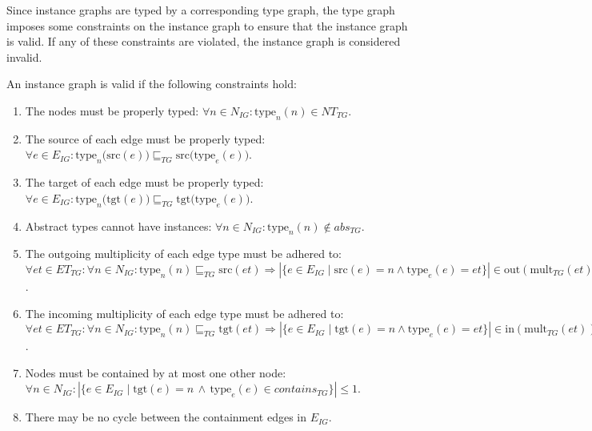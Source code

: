 Since instance graphs are typed by a corresponding type graph, the type graph imposes some constraints on the instance graph to ensure that the instance graph is valid. If any of these constraints are violated, the instance graph is considered invalid.

\begin{defin}
\label{defin:formalisations:groove_formalisation:instance_graphs:instance_graph_validity}
An instance graph is valid if the following constraints hold:
\begin{enumerate}
    \item The nodes must be properly typed: $\forall n \in N_{IG}\!: \mathrm{type}_n(n) \in NT_{TG}$.
    \item The source of each edge must be properly typed: $\forall e \in E_{IG}\!: \mathrm{type}_n \big(\mathrm{src}(e)\big) \sqsubseteq_{TG} \mathrm{src} \big(\mathrm{type}_e(e)\big)$.
    \item The target of each edge must be properly typed: $\forall e \in E_{IG}\!: \mathrm{type}_n \big(\mathrm{tgt}(e)\big) \sqsubseteq_{TG} \mathrm{tgt} \big(\mathrm{type}_e(e)\big)$.
    \item Abstract types cannot have instances: $\forall n \in N_{IG}\!: \mathrm{type}_n(n) \not\in abs_{TG}$.
    \item The outgoing multiplicity of each edge type must be adhered to: $\forall et \in ET_{TG}\!: \forall n \in N_{IG}\!: \mathrm{type}_n(n) \sqsubseteq_{TG} \mathrm{src}(et) \Longrightarrow |\{e \in E_{IG} \mid \mathrm{src}(e) = n \land \mathrm{type}_e(e) = et\}| \in \mathrm{out}(\mathrm{mult}_{TG}(et))$.
    \item The incoming multiplicity of each edge type must be adhered to: $\forall et \in ET_{TG}\!: \forall n \in N_{IG}\!: \mathrm{type}_n(n) \sqsubseteq_{TG} \mathrm{tgt}(et) \Longrightarrow |\{e \in E_{IG} \mid \mathrm{tgt}(e) = n \land \mathrm{type}_e(e) = et\}| \in \mathrm{in}(\mathrm{mult}_{TG}(et))$.
    \item Nodes must be contained by at most one other node: $\forall n \in N_{IG}\!: |\{e \in E_{IG} \mid \mathrm{tgt}(e) = n\,\land\,\mathrm{type}_e(e) \in contains_{TG}\}| \leq 1$.
    \item There may be no cycle between the containment edges in $E_{IG}$.
\end{enumerate}

\end{defin}

